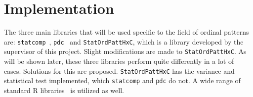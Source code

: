 \section{Implementation}
The three main libraries that will be used specific to the field of ordinal patterns are: \texttt{statcomp}~\cite{statcomp}, \texttt{pdc}~\cite{pdc} and \texttt{StatOrdPattHxC}, which is a library developed by the supervisor of this project. 
Slight modifications are made to \texttt{StatOrdPattHxC}. 
As will be shown later, these three libraries perform quite differently in a lot of cases. Solutions for this are proposed. \texttt{StatOrdPattHxC} has the variance and statistical test implemented, which \texttt{statcomp} and \texttt{pdc} do not. 
A wide range of standard R libraries~\cite{RSoftware} is utilized as well.